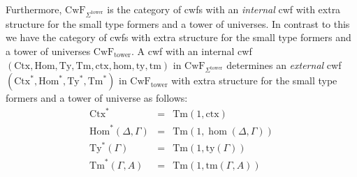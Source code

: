 \documentclass[submission,copyright,creativecommons]{eptcs}
\newcommand{\id}{\mathsf{id}}
\newcommand{\Ctx}{\mathrm{Ctx}}
\newcommand{\Sub}{\mathrm{Hom}}
\newcommand{\Ty}{\mathrm{Ty}}
\newcommand{\Tm}{\mathrm{Tm}}
\def\sub{\mathrm{hom}}
\def\id{\mathrm{id}}
\newcommand{\ctx}{\mathrm{ctx}}
\newcommand{\ty}{\mathrm{ty}}
\newcommand{\tm}{\mathrm{tm}}
\newcommand{\tuple}[1]{\langle #1 \rangle}
\def\p{\mathrm{p}}
\def\CwF{\mathrm{CwF}}
\def\CwFext{\mathrm{CwF_{tower}}}
\def\Sigmaext{{\Sigma^\mathrm{tower}}}
\begin{document}
Furthermore, $\CwF_{\Sigmaext}$ is the category of cwfs with an {\em internal} cwf with extra structure for the small type formers and a tower of universes. In contrast to this we have the category of cwfs with extra structure for the small type formers and a tower of universes $\CwFext$. A cwf with an internal cwf $(\Ctx,\Sub,\Ty,\Tm,\ctx,\sub,\ty,\tm)$ in $\CwF_{\Sigmaext}$ determines an {\em external} cwf $(\Ctx^*,\Sub^*,\Ty^*,\Tm^*)$ in $\CwFext$ with extra structure for the small type formers and a tower of universe  as follows:
\begin{eqnarray*}
\Ctx^* &=& \Tm(1,\ctx)\\
\Sub^*(\Delta,\Gamma) &=& \Tm(1,\hom(\Delta,\Gamma))\\
\Ty^*(\Gamma) &=& \Tm(1,\ty(\Gamma))\\
\Tm^*(\Gamma,A) &=& \Tm(1,\tm(\Gamma,A))
\end{eqnarray*}
%
\end{document}
